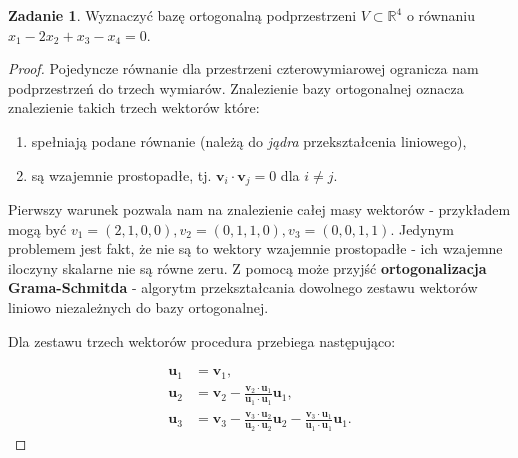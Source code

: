 \documentclass[11pt]{article}
\theoremstyle{definition}
\newtheorem{zadanie}{Zadanie}
\begin{document}
\begin{zadanie}
    Wyznaczyć bazę ortogonalną podprzestrzeni $V\subset \mathbb R^4$ o równaniu $x_1-2x_2+x_3-x_4 = 0$.
\end{zadanie}
\begin{proof}
    Pojedyncze równanie dla przestrzeni czterowymiarowej ogranicza nam podprzestrzeń do trzech wymiarów. Znalezienie bazy ortogonalnej oznacza znalezienie takich trzech wektorów które:
    \begin{enumerate}
        \item spełniają podane równanie (należą do \textit{jądra} przekształcenia liniowego),
        \item są wzajemnie prostopadłe, tj. $\mathbf v_i\cdot\mathbf v_j = 0$ dla $i\neq j$.
    \end{enumerate}

    Pierwszy warunek pozwala nam na znalezienie całej masy wektorów - przykładem mogą być $v_1=(2,1,0,0), v_2 = (0,1,1,0), v_3=(0,0,1,1)$. Jedynym problemem jest fakt, że nie są to wektory wzajemnie prostopadłe - ich wzajemne iloczyny skalarne nie są równe zeru. Z pomocą może przyjść \textbf{ortogonalizacja Grama-Schmitda} - algorytm przekształcania dowolnego zestawu wektorów liniowo niezależnych do bazy ortogonalnej.

    Dla zestawu trzech wektorów procedura przebiega następująco:

    \begin{align*}
        \mathbf u_1 & = \mathbf v_1,                                                                                                                                                              \\
        \mathbf u_2 & = \mathbf v_2 - \frac{\mathbf v_2\cdot \mathbf u_1}{\mathbf u_1\cdot \mathbf u_1}\mathbf u_1,                                                                               \\
        \mathbf u_3 & = \mathbf v_3 - \frac{\mathbf v_3\cdot \mathbf u_2}{\mathbf u_2\cdot \mathbf u_2}\mathbf u_2- \frac{\mathbf v_3\cdot \mathbf u_1}{\mathbf u_1\cdot \mathbf u_1}\mathbf u_1.
    \end{align*}
\end{proof}
\end{document}
